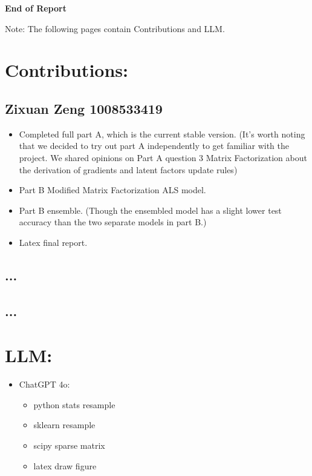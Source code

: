 \documentclass{article}
\begin{document}
\vspace*{5cm}
\begin{center}
\Large\bfseries End of Report
\end{center}
Note: The following pages contain Contributions and LLM.

\newpage
\section*{Contributions:}
\subsection*{Zixuan Zeng 1008533419}
\begin{itemize}
    \item Completed full part A, which is the current stable version.\newline
    (It's worth noting that we decided to try out part A independently to get familiar with the project. We shared opinions on Part A question 3 Matrix Factorization about the derivation of gradients and latent factors update rules)
    \item Part B Modified Matrix Factorization ALS model.
    \item Part B ensemble.\newline
    (Though the ensembled model has a slight lower test accuracy than the two separate models in part B.)
    \item Latex final report.
\end{itemize}
\subsection*{...}
\subsection*{...}

\newpage
\section*{LLM:}
\begin{itemize}
    \item ChatGPT 4o:
    \begin{itemize}
        \item python stats resample
        \item sklearn resample
        \item scipy sparse matrix
        \item latex draw figure
    \end{itemize}
\end{itemize}
\end{document}
